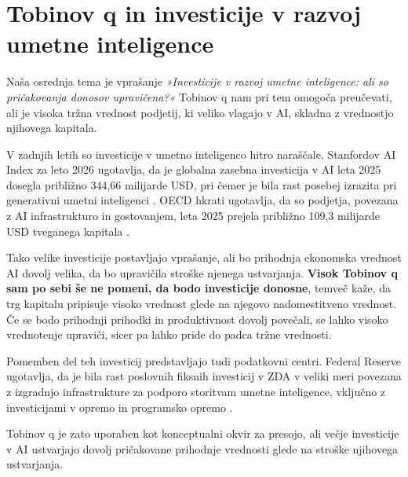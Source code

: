 \documentclass[12pt,a4paper]{article}
\begin{document}
\section{Tobinov q in investicije v razvoj umetne inteligence}
Naša osrednja tema je vprašanje \textit{»Investicije v razvoj umetne inteligence: ali so pričakovanja donosov upravičena?«}
Tobinov q nam pri tem omogoča preučevati, ali je visoka tržna vrednost podjetij, ki veliko vlagajo v AI, skladna z vrednostjo njihovega kapitala.

V zadnjih letih so investicije v umetno inteligenco hitro naraščale. Stanfordov AI Index 
za leto 2026 ugotavlja, da je globalna zasebna investicija v AI leta 2025 dosegla približno 
344,66 milijarde USD, pri čemer je bila rast posebej izrazita pri generativni umetni 
inteligenci \citep{StanfordAIIndex2026}. OECD hkrati ugotavlja, da so podjetja, povezana 
z AI infrastrukturo in gostovanjem, leta 2025 prejela približno 109,3 milijarde USD 
tveganega kapitala \citep{OECD2026}.

Tako velike investicije postavljajo vprašanje, ali bo prihodnja ekonomska vrednost 
AI dovolj velika, da bo upravičila stroške njenega ustvarjanja. \textbf{Visok Tobinov 
q sam po sebi še ne pomeni, da bodo investicije donosne}, temveč kaže, da trg kapitalu 
pripisuje visoko vrednost glede na njegovo nadomestitveno vrednost. Če se bodo prihodnji 
prihodki in produktivnost dovolj povečali, se lahko visoko vrednotenje upraviči, sicer pa 
lahko pride do padca tržne vrednosti.

Pomemben del teh investicij predstavljajo tudi podatkovni centri. Federal Reserve 
ugotavlja, da je bila rast poslovnih fiksnih investicij v ZDA v veliki meri povezana 
z izgradnjo infrastrukture za podporo storitvam umetne inteligence, vključno z 
investicijami v opremo in programsko opremo \citep{FederalReserve2026}.

Tobinov q je zato uporaben kot konceptualni okvir za presojo, ali večje investicije v 
AI ustvarjajo dovolj pričakovane prihodnje vrednosti glede na stroške njihovega 
ustvarjanja.


\end{document}
